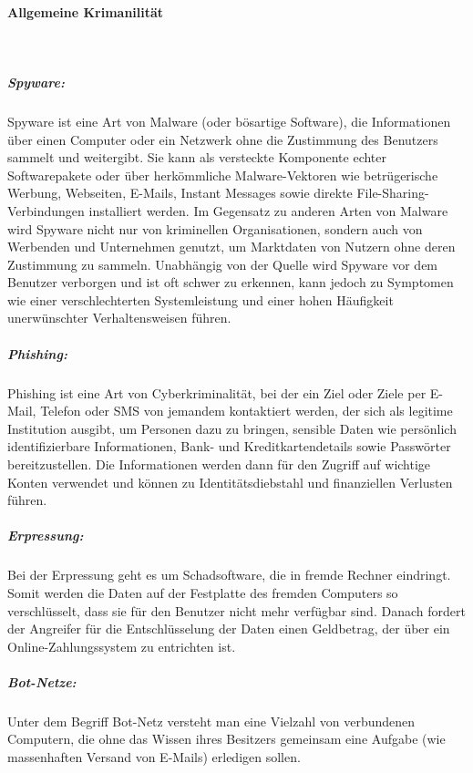 \paragraph{Allgemeine Krimanilität}\mbox{}\\

\subparagraph{Spyware: }

Spyware ist eine Art von Malware (oder bösartige Software), die Informationen über einen Computer oder ein Netzwerk ohne die Zustimmung des Benutzers sammelt und weitergibt. Sie kann als versteckte Komponente echter Softwarepakete oder über herkömmliche Malware-Vektoren wie betrügerische Werbung, Webseiten, E-Mails, Instant Messages sowie direkte File-Sharing-Verbindungen installiert werden. Im Gegensatz zu anderen Arten von Malware wird Spyware nicht nur von kriminellen Organisationen, sondern auch von Werbenden und Unternehmen genutzt, um Marktdaten von Nutzern ohne deren Zustimmung zu sammeln. Unabhängig von der Quelle wird Spyware vor dem Benutzer verborgen und ist oft schwer zu erkennen, kann jedoch zu Symptomen wie einer verschlechterten Systemleistung und einer hohen Häufigkeit unerwünschter Verhaltensweisen führen\cite{spy12}.

\subparagraph{Phishing: }

Phishing ist eine Art von Cyberkriminalität, bei der ein Ziel oder Ziele per E-Mail, Telefon oder SMS von jemandem kontaktiert werden, der sich als legitime Institution ausgibt, um Personen dazu zu bringen, sensible Daten wie persönlich identifizierbare Informationen, Bank- und Kreditkartendetails sowie Passwörter bereitzustellen. Die Informationen werden dann für den Zugriff auf wichtige Konten verwendet und können zu Identitätsdiebstahl und finanziellen Verlusten führen\cite{phishing17ph}.

\subparagraph{Erpressung: }

Bei der Erpressung geht es um Schadsoftware, die in fremde Rechner eindringt. Somit werden die Daten auf der Festplatte des fremden Computers so verschlüsselt, dass sie für den Benutzer nicht mehr verfügbar sind. Danach fordert der Angreifer für die Entschlüsselung der Daten einen Geldbetrag, der über ein Online-Zahlungssystem zu entrichten ist\cite[48]{eckert2013sicherheit}.

\subparagraph{Bot-Netze: }

Unter dem Begriff Bot-Netz versteht man eine Vielzahl von verbundenen Computern, die ohne das Wissen ihres Besitzers gemeinsam eine Aufgabe (wie massenhaften Versand von E-Mails) erledigen sollen\cite{botnetz17symantec}.

